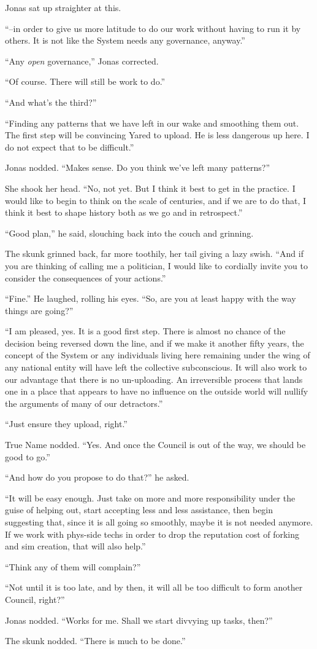 Jonas sat up straighter at this.

``--in order to give us more latitude to do our work without having to run it by others. It is not like the System needs any governance, anyway.''

``Any \emph{open} governance,'' Jonas corrected.

``Of course. There will still be work to do.''

``And what's the third?''

``Finding any patterns that we have left in our wake and smoothing them out. The first step will be convincing Yared to upload. He is less dangerous up here. I do not expect that to be difficult.''

Jonas nodded. ``Makes sense. Do you think we've left many patterns?''

She shook her head. ``No, not yet. But I think it best to get in the practice. I would like to begin to think on the scale of centuries, and if we are to do that, I think it best to shape history both as we go and in retrospect.''

``Good plan,'' he said, slouching back into the couch and grinning.

The skunk grinned back, far more toothily, her tail giving a lazy swish. ``And if you are thinking of calling me a politician, I would like to cordially invite you to consider the consequences of your actions.''

``Fine.'' He laughed, rolling his eyes. ``So, are you at least happy with the way things are going?''

``I am pleased, yes. It is a good first step. There is almost no chance of the decision being reversed down the line, and if we make it another fifty years, the concept of the System or any individuals living here remaining under the wing of any national entity will have left the collective subconscious. It will also work to our advantage that there is no un-uploading. An irreversible process that lands one in a place that appears to have no influence on the outside world will nullify the arguments of many of our detractors.''

``Just ensure they upload, right.''

True Name nodded. ``Yes. And once the Council is out of the way, we should be good to go.''

``And how do you propose to do that?'' he asked.

``It will be easy enough. Just take on more and more responsibility under the guise of helping out, start accepting less and less assistance, then begin suggesting that, since it is all going so smoothly, maybe it is not needed anymore. If we work with phys-side techs in order to drop the reputation cost of forking and sim creation, that will also help.''

``Think any of them will complain?''

``Not until it is too late, and by then, it will all be too difficult to form another Council, right?''

Jonas nodded. ``Works for me. Shall we start divvying up tasks, then?''

The skunk nodded. ``There is much to be done.''
